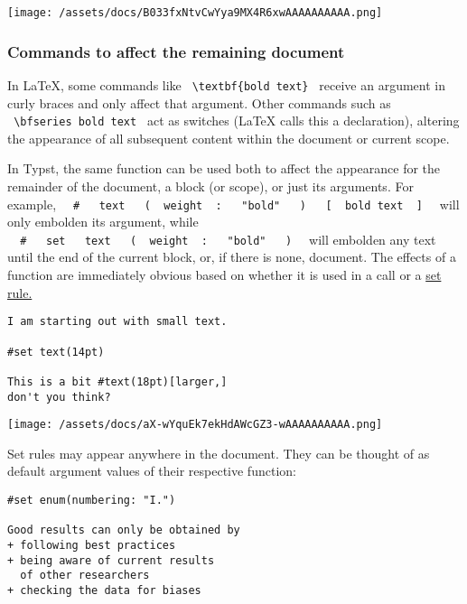 \texttt{[image: /assets/docs/B033fxNtvCwYya9MX4R6xwAAAAAAAAAA.png]}

\subsubsection{Commands to affect the remaining document}\label{rules}

In LaTeX, some commands like
\texttt{\ \textbackslash{}textbf\{bold\ text\}\ } receive an argument in
curly braces and only affect that argument. Other commands such as
\texttt{\ \textbackslash{}bfseries\ bold\ text\ } act as switches (LaTeX
calls this a declaration), altering the appearance of all subsequent
content within the document or current scope.

In Typst, the same function can be used both to affect the appearance
for the remainder of the document, a block (or scope), or just its
arguments. For example,
\texttt{\ }{\texttt{\ \#\ }}\texttt{\ }{\texttt{\ text\ }}\texttt{\ }{\texttt{\ (\ }}\texttt{\ weight\ }{\texttt{\ :\ }}\texttt{\ }{\texttt{\ "bold"\ }}\texttt{\ }{\texttt{\ )\ }}\texttt{\ }{\texttt{\ {[}\ }}\texttt{\ bold\ text\ }{\texttt{\ {]}\ }}\texttt{\ }
will only embolden its argument, while
\texttt{\ }{\texttt{\ \#\ }}\texttt{\ }{\texttt{\ set\ }}\texttt{\ }{\texttt{\ text\ }}\texttt{\ }{\texttt{\ (\ }}\texttt{\ weight\ }{\texttt{\ :\ }}\texttt{\ }{\texttt{\ "bold"\ }}\texttt{\ }{\texttt{\ )\ }}\texttt{\ }
will embolden any text until the end of the current block, or, if there
is none, document. The effects of a function are immediately obvious
based on whether it is used in a call or a
\href{/docs/reference/styling/\#set-rules}{set rule.}

\begin{verbatim}
I am starting out with small text.

#set text(14pt)

This is a bit #text(18pt)[larger,]
don't you think?
\end{verbatim}

\texttt{[image: /assets/docs/aX-wYquEk7ekHdAWcGZ3-wAAAAAAAAAA.png]}

Set rules may appear anywhere in the document. They can be thought of as
default argument values of their respective function:

\begin{verbatim}
#set enum(numbering: "I.")

Good results can only be obtained by
+ following best practices
+ being aware of current results
  of other researchers
+ checking the data for biases
\end{verbatim}

